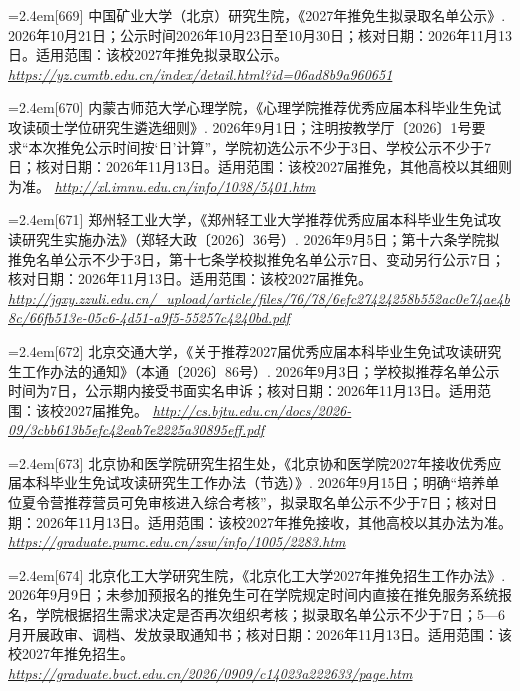 \par\noindent\hangindent=2.4em\label{src:S0815}{\color{cAccent}[669]} 中国矿业大学（北京）研究生院，《2027年推免生拟录取名单公示》. 2026年10月21日；公示时间2026年10月23日至10月30日；核对日期：2026年11月13日。适用范围：该校2027年推免拟录取公示。 \textit{\url{https://yz.cumtb.edu.cn/index/detail.html?id=06ad8b9a960651}}\par
\par\noindent\hangindent=2.4em\label{src:S0816}{\color{cAccent}[670]} 内蒙古师范大学心理学院，《心理学院推荐优秀应届本科毕业生免试攻读硕士学位研究生遴选细则》. 2026年9月1日；注明按教学厅〔2026〕1号要求“本次推免公示时间按‘日’计算”，学院初选公示不少于3日、学校公示不少于7日；核对日期：2026年11月13日。适用范围：该校2027届推免，其他高校以其细则为准。 \textit{\url{http://xl.imnu.edu.cn/info/1038/5401.htm}}\par
\par\noindent\hangindent=2.4em\label{src:S0817}{\color{cAccent}[671]} 郑州轻工业大学，《郑州轻工业大学推荐优秀应届本科毕业生免试攻读研究生实施办法》（郑轻大政〔2026〕36号）. 2026年9月5日；第十六条学院拟推免名单公示不少于3日，第十七条学校拟推免名单公示7日、变动另行公示7日；核对日期：2026年11月13日。适用范围：该校2027届推免。 \textit{\url{http://jgxy.zzuli.edu.cn/_upload/article/files/76/78/6efc27424258b552ac0e74ae4b8c/66fb513e-05c6-4d51-a9f5-55257c4240bd.pdf}}\par
\par\noindent\hangindent=2.4em\label{src:S0818}{\color{cAccent}[672]} 北京交通大学，《关于推荐2027届优秀应届本科毕业生免试攻读研究生工作办法的通知》（本通〔2026〕86号）. 2026年9月3日；学校拟推荐名单公示时间为7日，公示期内接受书面实名申诉；核对日期：2026年11月13日。适用范围：该校2027届推免。 \textit{\url{http://cs.bjtu.edu.cn/docs/2026-09/3cbb613b5efc42eab7e2225a30895eff.pdf}}\par
\par\noindent\hangindent=2.4em\label{src:S0819}{\color{cAccent}[673]} 北京协和医学院研究生招生处，《北京协和医学院2027年接收优秀应届本科毕业生免试攻读研究生工作办法（节选）》. 2026年9月15日；明确“培养单位夏令营推荐营员可免审核进入综合考核”，拟录取名单公示不少于7日；核对日期：2026年11月13日。适用范围：该校2027年推免接收，其他高校以其办法为准。 \textit{\url{https://graduate.pumc.edu.cn/zsw/info/1005/2283.htm}}\par
\par\noindent\hangindent=2.4em\label{src:S0820}{\color{cAccent}[674]} 北京化工大学研究生院，《北京化工大学2027年推免招生工作办法》. 2026年9月9日；未参加预报名的推免生可在学院规定时间内直接在推免服务系统报名，学院根据招生需求决定是否再次组织考核；拟录取名单公示不少于7日；5—6月开展政审、调档、发放录取通知书；核对日期：2026年11月13日。适用范围：该校2027年推免招生。 \textit{\url{https://graduate.buct.edu.cn/2026/0909/c14023a222633/page.htm}}\par
